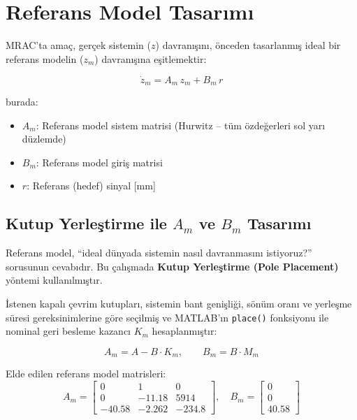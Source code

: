 \documentclass[12pt,a4paper]{article}
\begin{document}
\section{Referans Model Tasarımı}
\label{sec:refmodel}

MRAC'ta amaç, gerçek sistemin ($z$) davranışını, önceden tasarlanmış ideal bir referans modelin ($z_m$) davranışına eşitlemektir:

\begin{equation}
    \dot{z}_m = A_m\,z_m + B_m\,r
    \label{eq:refmodel}
\end{equation}

burada:
\begin{itemize}
    \item $A_m$: Referans model sistem matrisi (Hurwitz -- tüm özdeğerleri sol yarı düzlemde)
    \item $B_m$: Referans model giriş matrisi
    \item $r$: Referans (hedef) sinyal [mm]
\end{itemize}

\subsection{Kutup Yerleştirme ile $A_m$ ve $B_m$ Tasarımı}

Referans model, ``ideal dünyada sistemin nasıl davranmasını istiyoruz?'' sorusunun cevabıdır. Bu çalışmada \textbf{Kutup Yerleştirme (Pole Placement)} yöntemi kullanılmıştır.

İstenen kapalı çevrim kutupları, sistemin bant genişliği, sönüm oranı ve yerleşme süresi gereksinimlerine göre seçilmiş ve MATLAB'ın \texttt{place()} fonksiyonu ile nominal geri besleme kazancı $K_m$ hesaplanmıştır:

\begin{equation}
    A_m = A - B \cdot K_m, \qquad B_m = B \cdot M_m
\end{equation}

Elde edilen referans model matrisleri:
\begin{equation}
    A_m = \begin{bmatrix}
        0 & 1 & 0 \\
        0 & -11.18 & 5914 \\
        -40.58 & -2.262 & -234.8
    \end{bmatrix}, \quad
    B_m = \begin{bmatrix} 0 \\ 0 \\ 40.58 \end{bmatrix}
\end{equation}
\end{document}
